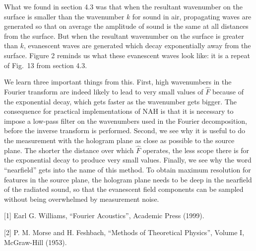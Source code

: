   What we found in section 4.3 was that when the resultant wavenumber on the 
  surface is smaller than the wavenumber $k$ for sound in air, propagating 
  waves are generated so that on average the amplitude of sound is the same at 
  all distances from the surface. But when the resultant wavenumber on the 
  surface is greater than $k$, evanescent waves are generated which decay 
  exponentially away from the surface. Figure 2 reminds us what these 
  evanescent waves look like: it is a repeat of Fig.\ 13 from section 4.3. 

  We learn three important things from this. First, high wavenumbers in the 
  Fourier transform are indeed likely to lead to very small values of $\hat{F}$ 
  because of the exponential decay, which gets faster as the wavenumber gets 
  bigger. The consequence for practical implementations of NAH is that it is 
  necessary to impose a low-pass filter on the wavenumbers used in the Fourier 
  decomposition, before the inverse transform is performed. Second, we see why 
  it is useful to do the measurement with the hologram plane as close as 
  possible to the source plane. The shorter the distance over which $\hat{F}$ 
  operates, the less scope there is for the exponential decay to produce very 
  small values. Finally, we see why the word ``nearfield'' gets into the name 
  of this method. To obtain maximum resolution for features in the source 
  plane, the hologram plane needs to be deep in the nearfield of the radiated 
  sound, so that the evanescent field components can be sampled without being 
  overwhelmed by measurement noise. 

  \sectionreferences{}[1] Earl G. Williams, “Fourier Acoustics”, Academic Press 
  (1999). 

  [2] P. M. Morse and H. Feshbach, “Methods of Theoretical Physics”, Volume I, 
  McGraw-Hill (1953). 